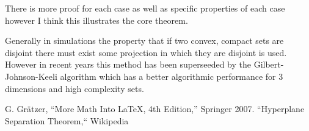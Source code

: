\documentclass[11pt]{amsart}
\theoremstyle{remark}
\theoremstyle{definition}
\begin{document}
\vspace{8pt}

There is more proof for each case as well as specific properties
of each case however I think this illustrates the core
theorem.


Generally in simulations the property that if two convex,
compact sets are disjoint there must exist some projection
in which they are disjoint is used. However in recent
years this method has been superseeded by the Gilbert-Johnson-Keeli
algorithm which has a better algorithmic performance for
3 dimensions and high complexity sets.

\begin{thebibliography}{1}
 G. Gr\"atzer, ``More Math Into LaTeX, 4th Edition,'' Springer 2007.
 ``Hyperplane Separation Theorem,`` Wikipedia
\end{thebibliography}
\end{document}
